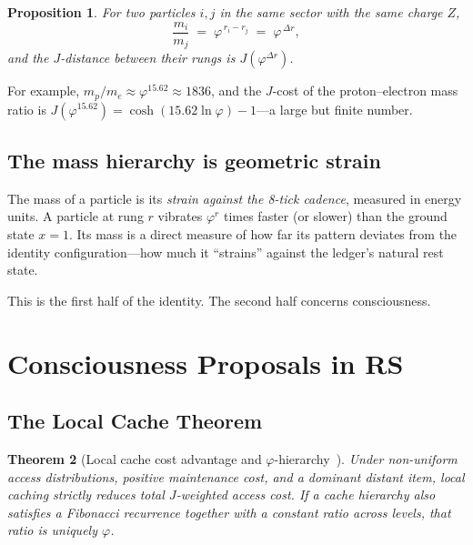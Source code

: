 \documentclass[11pt,a4paper]{article}
\theoremstyle{plain}
\newtheorem{theorem}{Theorem}[section]
\newtheorem{proposition}[theorem]{Proposition}
\theoremstyle{definition}
\theoremstyle{remark}
\newcommand{\Jcost}{J}
\newcommand{\vp}{\varphi}
\begin{document}
\begin{proposition}
\label{prop:mass-ratio}
For two particles $i, j$ in the same sector with the same charge $Z$,
\begin{equation}
  \frac{m_i}{m_j} \;=\; \vp^{\,r_i - r_j}
  \;=\; \vp^{\,\Delta r},
\end{equation}
and the $\Jcost$-distance between their rungs is
$\Jcost(\vp^{\Delta r})$.
\end{proposition}

For example, $m_p / m_e \approx \vp^{15.62} \approx 1836$, and the
$\Jcost$-cost of the proton--electron mass ratio is
$\Jcost(\vp^{15.62}) = \cosh(15.62 \ln\vp) - 1$---a large but
finite number.

\subsection{The mass hierarchy is geometric strain}

The mass of a particle is its \emph{strain against the 8-tick cadence},
measured in energy units.  A particle at rung $r$ vibrates $\vp^r$
times faster (or slower) than the ground state $x = 1$.  Its mass
is a direct measure of how far its pattern deviates from the identity
configuration---how much it ``strains'' against the ledger's natural
rest state.

This is the first half of the identity.  The second half concerns
consciousness.

\section{Consciousness Proposals in RS}
\label{sec:consciousness}

\subsection{The Local Cache Theorem}

\begin{theorem}[Local cache cost advantage and $\vp$-hierarchy~\cite{WashburnLocalCache2026}]
\label{thm:local-cache}
Under non-uniform access distributions, positive maintenance cost, and
a dominant distant item, local caching strictly reduces total
$\Jcost$-weighted access cost.  If a cache hierarchy also satisfies a
Fibonacci recurrence together with a constant ratio across levels, that
ratio is uniquely $\vp$.
\end{theorem}
\end{document}
